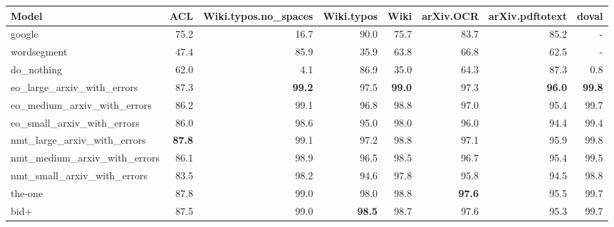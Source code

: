 \begin{tabular}{lrrrrrrr} \hline
Model & ACL & Wiki.typos.no\_spaces & Wiki.typos & Wiki & arXiv.OCR & arXiv.pdftotext & doval \\ \hline
google & 75.2 & 16.7 & 90.0 & 75.7 & 83.7 & 85.2 & - \\ 
wordsegment & 47.4 & 85.9 & 35.9 & 63.8 & 66.8 & 62.5 & - \\ 
do\_nothing & 62.0 & 4.1 & 86.9 & 35.0 & 64.3 & 87.3 & 0.8 \\ \hline
eo\_large\_arxiv\_with\_errors & 87.3 & \textbf{99.2} & 97.5 & \textbf{99.0} & 97.3 & \textbf{96.0} & \textbf{99.8} \\ 
eo\_medium\_arxiv\_with\_errors & 86.2 & 99.1 & 96.8 & 98.8 & 97.0 & 95.4 & 99.7 \\ 
eo\_small\_arxiv\_with\_errors & 86.0 & 98.6 & 95.0 & 98.0 & 96.0 & 94.4 & 99.4 \\ \hline
nmt\_large\_arxiv\_with\_errors & \textbf{87.8} & 99.1 & 97.2 & 98.8 & 97.1 & 95.9 & 99.8 \\ 
nmt\_medium\_arxiv\_with\_errors & 86.1 & 98.9 & 96.5 & 98.5 & 96.7 & 95.4 & 99.5 \\ 
nmt\_small\_arxiv\_with\_errors & 83.5 & 98.2 & 94.6 & 97.8 & 95.8 & 94.5 & 98.8 \\ \hline
the-one & 87.8 & 99.0 & 98.0 & 98.8 & \textbf{97.6} & 95.5 & 99.7 \\ 
bid+ & 87.5 & 99.0 & \textbf{98.5} & 98.7 & 97.6 & 95.3 & 99.7 \\ \hline
\end{tabular}